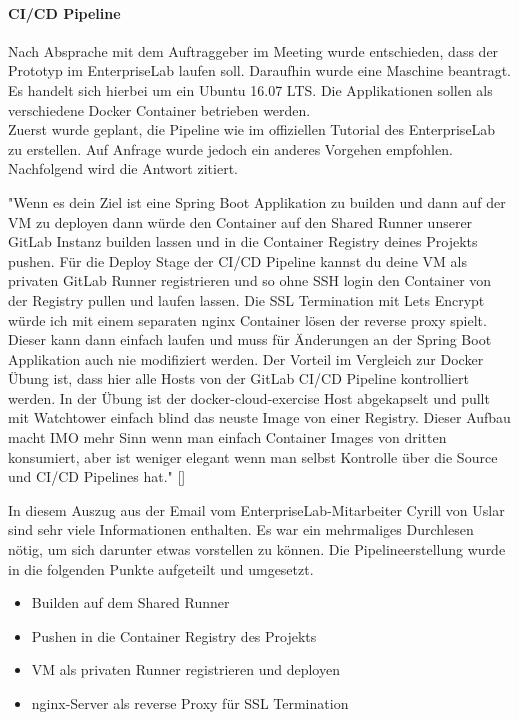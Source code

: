\paragraph{CI/CD Pipeline}
Nach Absprache mit dem Auftraggeber im Meeting wurde entschieden, dass der Prototyp im \gls{EnterpriseLab} laufen soll. Daraufhin wurde eine Maschine beantragt. Es handelt sich hierbei um ein Ubuntu 16.07 LTS. Die Applikationen sollen als verschiedene Docker Container betrieben werden. \\
Zuerst wurde geplant, die Pipeline wie im offiziellen Tutorial des \gls{EnterpriseLab} zu erstellen. Auf Anfrage wurde jedoch ein anderes Vorgehen empfohlen. Nachfolgend wird die Antwort zitiert. 

"Wenn es dein Ziel ist eine Spring Boot Applikation zu builden und dann auf der VM zu deployen dann würde den Container auf den Shared Runner unserer GitLab Instanz builden lassen und in die Container Registry deines Projekts pushen. Für die Deploy Stage der CI/CD Pipeline kannst du deine VM als privaten GitLab Runner registrieren und so ohne SSH login den Container von der Registry pullen und laufen lassen. Die SSL Termination mit Lets Encrypt würde ich mit einem separaten nginx Container lösen der reverse proxy spielt. Dieser kann dann einfach laufen und muss für Änderungen an der Spring Boot Applikation auch nie modifiziert werden. Der Vorteil im Vergleich zur Docker Übung ist, dass hier alle Hosts von der GitLab CI/CD Pipeline kontrolliert werden. In der Übung ist der docker-cloud-exercise Host abgekapselt und pullt mit Watchtower einfach blind das neuste Image von einer Registry. Dieser Aufbau macht IMO mehr Sinn wenn man einfach Container Images von dritten konsumiert, aber ist weniger elegant wenn man selbst Kontrolle über die Source und CI/CD Pipelines hat." [\cite{emailEnterpriselab:private}]

In diesem Auszug aus der Email vom \gls{EnterpriseLab}-Mitarbeiter Cyrill von Uslar sind sehr viele Informationen enthalten. Es war ein mehrmaliges Durchlesen nötig, um sich darunter etwas vorstellen zu können. Die Pipelineerstellung wurde in die folgenden Punkte aufgeteilt und umgesetzt.
\begin{itemize}
	\item Builden auf dem Shared Runner 
	\item Pushen in die Container Registry des Projekts
	\item VM als privaten Runner registrieren und deployen
	\item nginx-Server als reverse Proxy für SSL Termination
\end{itemize}

